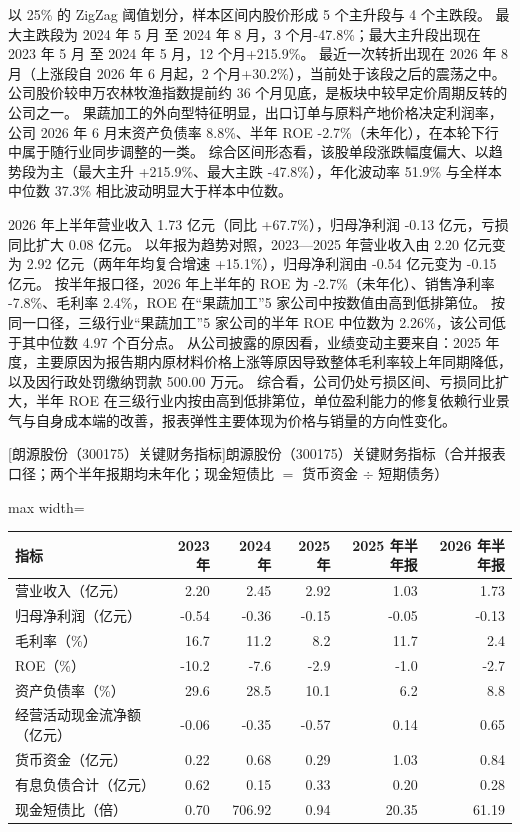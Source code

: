  以 25\% 的 ZigZag 阈值划分，样本区间内股价形成 5 个主升段与 4 个主跌段。 最大主跌段为 2024 年 5 月 至 2024 年 8 月，3 个月-47.8\%；最大主升段出现在 2023 年 5 月 至 2024 年 5 月，12 个月+215.9\%。 最近一次转折出现在 2026 年 8 月（上涨段自 2026 年 6 月起，2 个月+30.2\%），当前处于该段之后的震荡之中。 公司股价较申万农林牧渔指数提前约 36 个月见底，是板块中较早定价周期反转的公司之一。 果蔬加工的外向型特征明显，出口订单与原料产地价格决定利润率，公司 2026 年 6 月末资产负债率 8.8\%、半年 ROE -2.7\%（未年化），在本轮下行中属于随行业同步调整的一类。 综合区间形态看，该股单段涨跌幅度偏大、以趋势段为主（最大主升 +215.9\%、最大主跌 -47.8\%），年化波动率 51.9\% 与全样本中位数 37.3\% 相比波动明显大于样本中位数。

 2026 年上半年营业收入 1.73 亿元（同比 +67.7\%），归母净利润 -0.13 亿元，亏损同比扩大 0.08 亿元。 以年报为趋势对照，2023---2025 年营业收入由 2.20 亿元变为 2.92 亿元（两年年均复合增速 +15.1\%），归母净利润由 -0.54 亿元变为 -0.15 亿元。 按半年报口径，2026 年上半年的 ROE 为 -2.7\%（未年化）、销售净利率 -7.8\%、毛利率 2.4\%，ROE 在“果蔬加工”5 家公司中按数值由高到低排第位。 按同一口径，三级行业“果蔬加工”5 家公司的半年 ROE 中位数为 2.26\%，该公司低于其中位数 4.97 个百分点。 从公司披露的原因看，业绩变动主要来自：2025 年度，主要原因为报告期内原材料价格上涨等原因导致整体毛利率较上年同期降低，以及因行政处罚缴纳罚款 500.00 万元。 综合看，公司仍处亏损区间、亏损同比扩大，半年 ROE 在三级行业内按由高到低排第位，单位盈利能力的修复依赖行业景气与自身成本端的改善，报表弹性主要体现为价格与销量的方向性变化。

\begin{center}\small\setlength{\tabcolsep}{3.4pt}
[朗源股份（300175）关键财务指标]{朗源股份（300175）关键财务指标（合并报表口径；两个半年报期均未年化；现金短债比 $=$ 货币资金 $\div$ 短期债务）}
\begin{adjustbox}{max width=\textwidth}
\begin{tabular}{@{}lrrrrr@{}}
\toprule
指标 & 2023 年 & 2024 年 & 2025 年 & 2025 年半年报 & 2026 年半年报 \\
\midrule
营业收入（亿元） & 2.20 & 2.45 & 2.92 & 1.03 & 1.73 \\
归母净利润（亿元） & -0.54 & -0.36 & -0.15 & -0.05 & -0.13 \\
毛利率（\%） & 16.7 & 11.2 & 8.2 & 11.7 & 2.4 \\
ROE（\%） & -10.2 & -7.6 & -2.9 & -1.0 & -2.7 \\
资产负债率（\%） & 29.6 & 28.5 & 10.1 & 6.2 & 8.8 \\
经营活动现金流净额（亿元） & -0.06 & -0.35 & -0.57 & 0.14 & 0.65 \\
货币资金（亿元） & 0.22 & 0.68 & 0.29 & 1.03 & 0.84 \\
有息负债合计（亿元） & 0.62 & 0.15 & 0.33 & 0.20 & 0.28 \\
现金短债比（倍） & 0.70 & 706.92 & 0.94 & 20.35 & 61.19 \\
\bottomrule
\end{tabular}
\end{adjustbox}
\end{center}

